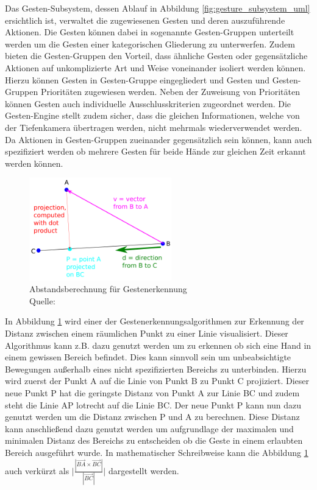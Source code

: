 Das Gesten-Subsystem, dessen Ablauf in Abbildung \ref{fig:gesture_subsystem_uml} ersichtlich ist, verwaltet die zugewiesenen Gesten und deren auszuführende Aktionen. Die Gesten können dabei in sogenannte Gesten-Gruppen unterteilt werden um die Gesten einer kategorischen Gliederung zu unterwerfen. Zudem bieten die Gesten-Gruppen den Vorteil, dass ähnliche Gesten oder gegensätzliche Aktionen auf unkomplizierte Art und Weise voneinander isoliert werden können. Hierzu können Gesten in Gesten-Gruppe eingegliedert und Gesten und Gesten-Gruppen Prioritäten zugewiesen werden. Neben der Zuweisung von Prioritäten können Gesten auch individuelle Ausschlusskriterien zugeordnet werden. Die Gesten-Engine stellt zudem sicher, dass die gleichen Informationen, welche von der Tiefenkamera übertragen werden, nicht mehrmals wiederverwendet werden. Da Aktionen in Gesten-Gruppen zueinander gegensätzlich sein können, kann auch spezifiziert werden ob mehrere Gesten für beide Hände zur gleichen Zeit erkannt werden können.

\begin{figure}[htb]
	\centering
	\includegraphics[width=0.55\textwidth]{images/loesungsweg/perpendicular_distance_illustration}
	\caption[Abstandsberechnung für Gestenerkennung]{Abstandsberechnung für Gestenerkennung
	\\Quelle: \cite{geometry_perpendicular_distance_nodate}}
	\label{fig:perpendicular_distance_illustration}
\end{figure}
\FloatBarrier

In Abbildung \ref{fig:perpendicular_distance_illustration} wird einer der Gestenerkennungsalgorithmen zur Erkennung der Distanz zwischen einem räumlichen Punkt zu einer Linie visualisiert. Dieser Algorithmus kann z.B. dazu genutzt werden um zu erkennen ob sich eine Hand in einem gewissen Bereich befindet. Dies kann sinnvoll sein um unbeabsichtigte Bewegungen außerhalb eines nicht spezifizierten Bereichs zu unterbinden. Hierzu wird zuerst der Punkt A auf die Linie von Punkt B zu Punkt C projiziert. Dieser neue Punkt P hat die geringste Distanz von Punkt A zur Linie BC und zudem steht die Linie AP lotrecht auf die Linie BC. Der neue Punkt P kann nun dazu genutzt werden um die Distanz zwischen P und A zu berechnen. Diese Distanz kann anschließend dazu genutzt werden um aufgrundlage der maximalen und minimalen Distanz des Bereichs zu entscheiden ob die Geste in einem erlaubten Bereich ausgeführt wurde. In mathematischer Schreibweise kann die Abbildung \ref{fig:perpendicular_distance_illustration} auch verkürzt als $\biggl| \frac{| \overrightarrow{BA} \times \overrightarrow{BC} |}{| \overrightarrow{BC} |} \biggl|$ dargestellt werden.

